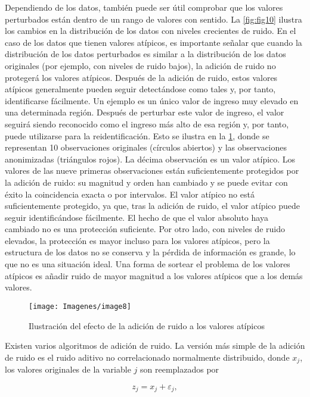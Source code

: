 \documentclass[
]{book}
\theoremstyle{definition}
\theoremstyle{definition}
\theoremstyle{definition}
\theoremstyle{definition}
\theoremstyle{remark}
\begin{document}
Dependiendo de los datos, también puede ser útil comprobar que los valores perturbados están dentro de un rango de valores con sentido. La \ref{fig:fig10} ilustra los cambios en la distribución de los datos con niveles crecientes de ruido. En el caso de los datos que tienen valores atípicos, es importante señalar que cuando la distribución de los datos perturbados es similar a la distribución de los datos originales (por ejemplo, con niveles de ruido bajos), la adición de ruido no protegerá los valores atípicos. Después de la adición de ruido, estos valores atípicos generalmente pueden seguir detectándose como tales y, por tanto, identificarse fácilmente. Un ejemplo es un único valor de ingreso muy elevado en una determinada región. Después de perturbar este valor de ingreso, el valor seguirá siendo reconocido como el ingreso más alto de esa región y, por tanto, puede utilizarse para la reidentificación. Esto se ilustra en la \ref{fig:fig9}, donde se representan 10 observaciones originales (círculos abiertos) y las observaciones anonimizadas (triángulos rojos). La décima observación es un valor atípico. Los valores de las nueve primeras observaciones están suficientemente protegidos por la adición de ruido: su magnitud y orden han cambiado y se puede evitar con éxito la coincidencia exacta o por intervalos. El valor atípico no está suficientemente protegido, ya que, tras la adición de ruido, el valor atípico puede seguir identificándose fácilmente. El hecho de que el valor absoluto haya cambiado no es una protección suficiente. Por otro lado, con niveles de ruido elevados, la protección es mayor incluso para los valores atípicos, pero la estructura de los datos no se conserva y la pérdida de información es grande, lo que no es una situación ideal. Una forma de sortear el problema de los valores atípicos es añadir ruido de mayor magnitud a los valores atípicos que a los demás valores.

\begin{figure}
\texttt{[image: Imagenes/image8]} \caption{Ilustración del efecto de la adición de ruido a los valores atípicos}\label{fig:fig9}
\end{figure}

Existen varios algoritmos de adición de ruido. La versión más simple de la adición de ruido es el ruido aditivo no correlacionado normalmente distribuido, donde \(x_j\), los valores originales de la variable \(j\) son reemplazados por

\[z_{j} = x_{j} + \varepsilon_{j},\]
\end{document}
